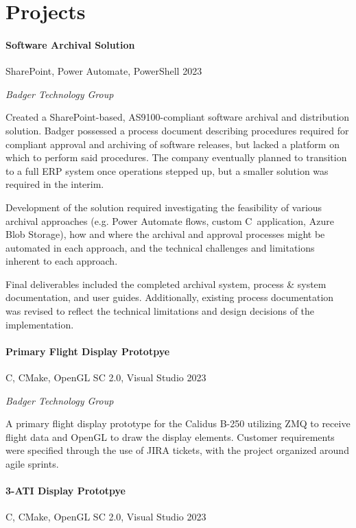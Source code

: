 \documentclass[10pt]{article}
\newcommand{\Rplus}{\protect\raisebox{0.35ex}{\smaller{\smaller{\textbf{+}}}}}
\newcommand{\Rsharp}{\protect\raisebox{0.35ex}{\smaller{\smaller{\textbf{\#}}}}}
\newcommand{\Cpp}{\mbox{C\Rplus\Rplus}}
\newcommand{\Csharp}{\mbox{C\Rsharp}}
\newcommand{\firstpar}{\vspace{4pt}\noindent}
\begin{document}
\section*{Projects}
\paragraph{Software Archival Solution}
\vline\quad SharePoint, Power Automate, PowerShell \hfill 2023

\noindent
\textit{Badger Technology Group}

\firstpar
Created a SharePoint-based, AS9100-compliant software archival and distribution solution.
Badger possessed a process document describing procedures required for compliant approval
and archiving of software releases, but lacked a platform on which to perform said procedures.
The company eventually planned to transition to a full ERP system once operations
stepped up, but a smaller solution was required in the interim.

Development of the solution required investigating the feasibility of various archival
approaches (e.g. Power Automate flows, custom \Csharp\ application, Azure Blob Storage),
how and where the archival and approval processes might be automated in each approach,
and the technical challenges and limitations inherent to each approach.

Final deliverables included the completed archival system, process \& system documentation,
and user guides. Additionally, existing process documentation was revised to reflect the
technical limitations and design decisions of the implementation.

\paragraph{Primary Flight Display Prototpye}
\vline\quad \Cpp, CMake, OpenGL SC 2.0, Visual Studio \hfill 2023

\noindent
\textit{Badger Technology Group}

\firstpar
A primary flight display prototype for the Calidus B-250 utilizing ZMQ to receive flight data
and OpenGL to draw the display elements. Customer requirements were specified through the use
of JIRA tickets, with the project organized around agile sprints.

\paragraph{3-ATI Display Prototpye}
\vline\quad \Cpp, CMake, OpenGL SC 2.0, Visual Studio \hfill 2023
\end{document}
